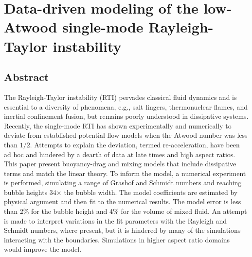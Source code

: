 \chapter{Data-driven modeling of the low-Atwood single-mode Rayleigh-Taylor instability}

\section{Abstract}

The Rayleigh-Taylor instability (RTI) pervades classical fluid dynamics and is essential to a diversity of phenomena, e.g., salt fingers, thermonuclear flames, and inertial confinement fusion, but remains poorly understood in dissipative systems.
Recently, the single-mode RTI has shown experimentally and numerically to deviate from established potential flow models when the Atwood number was less than $1/2$.
Attempts to explain the deviation, termed re-acceleration, have been ad hoc and hindered by a dearth of data at late times and high aspect ratios.
This paper present buoyancy-drag and mixing models that include dissipative terms and match the linear theory.
To inform the model, a numerical experiment is performed, simulating a range of Grashof and Schmidt numbers and reaching bubble heights 34$\times$ the bubble width.
The model coefficients are estimated by physical argument and then fit to the numerical results.
The model error is less than 2\% for the bubble height and 4\% for the volume of mixed fluid.
An attempt is made to interpret variations in the fit parameters with the Rayleigh and Schmidt numbers, where present, but it is hindered by many of the simulations interacting with the boundaries.
Simulations in higher aspect ratio domains would improve the model.
















